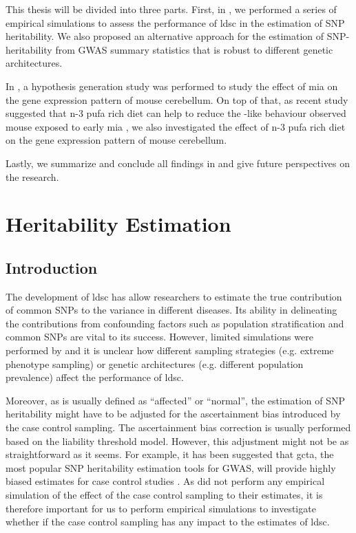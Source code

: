 \documentclass[12pt]{scrbook}
\newcommand*{\glng}{\glsentrylong}
\begin{document}
	This thesis will be divided into three parts.
	First, in , we performed a series of empirical simulations to assess the performance of \gls{ldsc} in the estimation of \gls{SNP} heritability. 
	We also proposed an alternative approach for the estimation of \gls{SNP}-heritability from \gls{GWAS} summary statistics that is robust to different genetic architectures.
	
	In , a hypothesis generation study was performed to study the effect of \gls{mia} on the gene expression pattern of mouse cerebellum. 
	On top of that, as recent study suggested that n-3 \gls{pufa} rich diet can help to reduce the \glng{scz}-like behaviour observed mouse exposed to early \gls{mia} \citep{Li2015}, we also investigated the effect of n-3 \gls{pufa} rich diet on the gene expression pattern of mouse cerebellum.
	
	Lastly, we summarize and conclude all findings in  and give future perspectives on the \glng{szc} research.

\chapter{Heritability Estimation}
\label{heritabilityChapter}
\section{Introduction}
The development of \gls{ldsc} \citep{Bulik-Sullivan2015} has allow researchers to estimate the true contribution of common \glspl{SNP} to the variance in different diseases.	
Its ability in delineating the contributions from confounding factors such as population stratification and common \glspl{SNP} are vital to its success.
However, limited simulations were performed by \citet{Bulik-Sullivan2015} and it is unclear how different sampling strategies (e.g. extreme phenotype sampling) or genetic architectures (e.g. different population prevalence) affect the performance of \gls{ldsc}.

Moreover, as \glng{scz} is usually defined as ``affected'' or ``normal'', the estimation of \gls{SNP} heritability might have to be adjusted for the ascertainment bias introduced by the case control sampling. 
The ascertainment bias correction is usually performed based on the liability threshold model.
However, this adjustment might not be as straightforward as it seems.
For example, it has been suggested that \gls{gcta}, the most popular \gls{SNP} heritability estimation tools for \gls{GWAS}, will provide highly biased estimates for case control studies \citep{Golan2014}.
As \citet{Bulik-Sullivan2015} did not perform any empirical simulation of the effect of the case control sampling to their estimates, it is therefore important for us to perform empirical simulations to investigate whether if the case control sampling has any impact to the estimates of \gls{ldsc}.
\end{document}
